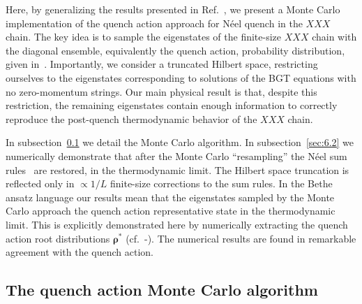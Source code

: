 \documentclass[11pt]{iopart}
\begin{document}
Here, by generalizing the results presented in Ref.~\cite{alba-2015}, we present 
a Monte Carlo implementation of the quench action approach for N\'eel quench in 
the $XXX$ chain. The key idea is to sample the eigenstates of the finite-size $XXX$ 
chain with the diagonal ensemble, equivalently the quench action, probability 
distribution, given in~. Importantly, we consider a truncated  
Hilbert space, restricting ourselves to the eigenstates corresponding to 
solutions of the BGT equations with no zero-momentum strings. Our main physical 
result is that, despite this restriction, the remaining eigenstates contain enough 
information to correctly reproduce the post-quench thermodynamic behavior of 
the $XXX$ chain. 

In subsection~\ref{sec:6.1} we detail the Monte Carlo algorithm. In 
subsection~\ref{sec:6.2} we numerically demonstrate that after the Monte Carlo 
``resampling'' the N\'eel sum rules~ are restored, in the 
thermodynamic limit. The Hilbert space truncation is reflected only in 
$\propto 1/L$ finite-size corrections to the sum rules. In the Bethe ansatz language 
our results mean that the eigenstates sampled by the Monte Carlo approach the 
quench action representative state in the thermodynamic limit. This is explicitly 
demonstrated here by numerically extracting the quench action root distributions 
$\pmb{\rho}^*$ (cf.~-). The numerical results are found 
in remarkable agreement with the quench action. 



\subsection{The quench action Monte Carlo algorithm}
\label{sec:6.1}
\end{document}
